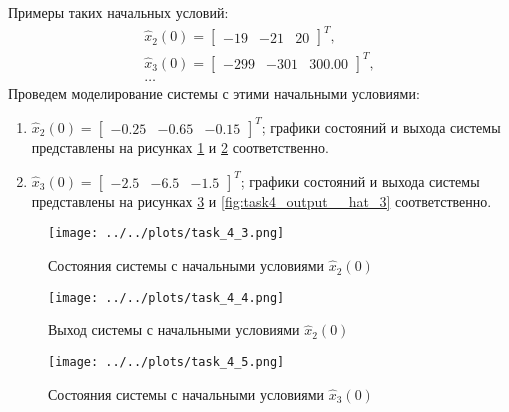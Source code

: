 Примеры таких начальных условий:
\begin{equation}
    \begin{array}{cc}
        \hat{x}_2(0) = \begin{bmatrix}
            -19 & -21 & 20
        \end{bmatrix}^T, \\
        \hat{x}_3(0) = \begin{bmatrix}
            -299 & -301 & 300.00 
        \end{bmatrix}^T, \\
        \ldots
    \end{array}
\end{equation}
Проведем моделирование системы с этими начальными условиями: 
\begin{enumerate}
    \item $\hat{x}_2(0) = \begin{bmatrix}
        -0.25 & -0.65 & -0.15
    \end{bmatrix}^T$; графики состояний и выхода системы представлены на рисунках \ref{fig:task4_states_hat_2} и \ref{fig:task4_output_hat_2} соответственно.
    \item $\hat{x}_3(0) = \begin{bmatrix}
        -2.5 & -6.5 & -1.5 
    \end{bmatrix}^T$; графики состояний и выхода системы представлены на рисунках \ref{fig:task4_states_hat_3} и \ref{fig:task4_output__hat_3} соответственно.
\end{enumerate}

\begin{figure}[ht!]
    \centering
    \texttt{[image: ../../plots/task\_4\_3.png]}
    \caption{Состояния системы с начальными условиями $\hat{x}_2(0)$}
    \label{fig:task4_states_hat_2}
\end{figure}

\begin{figure}[ht!]
    \centering
    \texttt{[image: ../../plots/task\_4\_4.png]}
    \caption{Выход системы с начальными условиями $\hat{x}_2(0)$}
    \label{fig:task4_output_hat_2}
\end{figure}

\begin{figure}[ht!]
    \centering
    \texttt{[image: ../../plots/task\_4\_5.png]}
    \caption{Состояния системы с начальными условиями $\hat{x}_3(0)$}
    \label{fig:task4_states_hat_3}
\end{figure}

